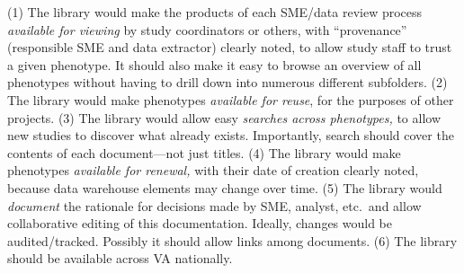 \documentclass{tufte-handout}
\begin{document}
(1) The library would make the products of each SME/data review
process \emph{available for viewing} by study coordinators or others,
with ``provenance'' (responsible SME and data extractor) clearly
noted, to allow study staff to trust a given phenotype. It should also
make it easy to browse an overview of all phenotypes without having to
drill down into numerous different subfolders. (2) The library would
make phenotypes \emph{available for reuse}, for the purposes of other
projects. (3) The library would allow easy \emph{searches across
  phenotypes,} to allow new studies to discover what already exists.
Importantly, search should cover the contents of each document---not
just titles. (4) The library would make phenotypes \emph{available for
  renewal,} with their date of creation clearly noted, because data
warehouse elements may change over time. (5) The library would
\emph{document} the rationale for decisions made by SME, analyst,
etc.\ and allow collaborative editing of this documentation. Ideally,
changes would be audited/tracked. Possibly it should allow links among
documents. (6) The library should be available across VA nationally.
\end{document}

